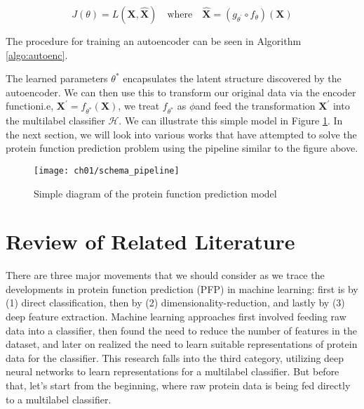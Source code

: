 \[
    J(\theta) = L(\mathbf{X}, \mathbf{\widehat{X}}) \quad \text{where} \quad
    \mathbf{\widehat{X}} = (g_{\theta^{\prime}} \circ f_{\theta}) (\mathbf{X})
\]

The procedure for training an autoencoder can be seen in Algorithm
\ref{algo:autoenc}.



The learned parameters $\theta^{\ast}$ encapsulates the latent structure
discovered by the autoencoder. We can then use this to transform our original
data via the encoder function\textemdash i.e, $ \mathbf{X}^{\prime} =
f_{\theta^{\ast}}(\mathbf{X})$, we treat $f_{\theta^{\ast}}$ as
$\phi$\textemdash and feed the transformation $\mathbf{X}^{\prime}$ into the
multilabel classifier $\mathcal{H}$. We can illustrate this simple model in
Figure \ref{schema:pipeline}. In the next section, we will look into various
works that have attempted to solve the protein function prediction problem
using the pipeline similar to the figure above.

\begin{figure}[!t]
  \centering
  \texttt{[image: ch01/schema\_pipeline]}
  \caption{Simple diagram of the protein function prediction model}
  \label{schema:pipeline}
\end{figure}

\section{Review of Related Literature}
\label{LiteratureReview}

\par There are three major movements that we should consider as we trace the
developments in protein function prediction (PFP) in machine learning: first
is by (1) direct classification, then by (2) dimensionality-reduction, and
lastly by (3) deep feature extraction. Machine learning approaches first
involved feeding raw data into a classifier, then found the need to reduce
the number of features in the dataset, and later on realized the need to
learn suitable representations of protein data for the classifier. This
research falls into the third category, utilizing deep neural networks to
learn representations for a multilabel classifier. But before that, let's
start from the beginning, where raw protein data is being fed directly to a
multilabel classifier.

